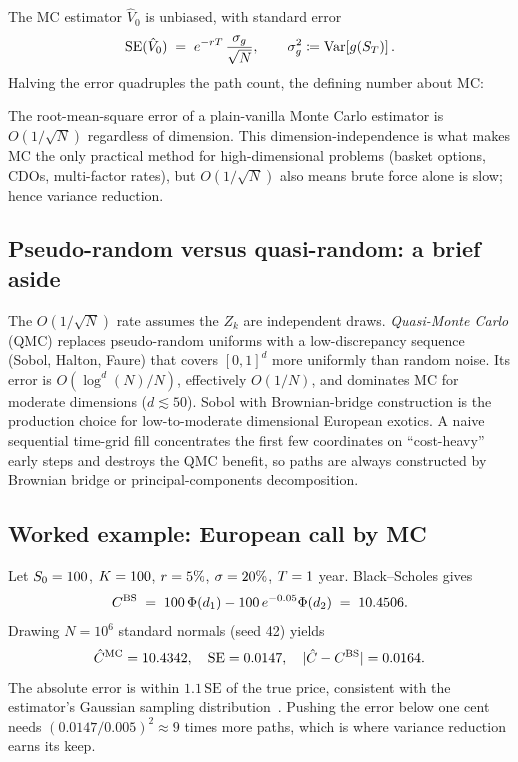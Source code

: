 The MC estimator $\hat V_0$ is unbiased, with standard error
\begin{equation}
  \mathrm{SE}(\hat V_0)
  \;=\; e^{-rT}\, \frac{\sigma_g}{\sqrt{N}},
  \qquad \sigma_g^2 \coloneqq \operatorname{Var}\!\left[ g(S_T) \right].
\end{equation}
Halving the error quadruples the path count, the defining number
about MC:

\begin{keyfactbox}
The root-mean-square error of a plain-vanilla Monte Carlo estimator
is $O(1/\sqrt{N})$ regardless of dimension.  This
dimension-independence is what makes MC the only practical method for
high-dimensional problems (basket options, CDOs, multi-factor rates),
but $O(1/\sqrt{N})$ also means brute force alone is slow; hence
variance reduction.
\end{keyfactbox}

\subsection{Pseudo-random versus quasi-random: a brief aside}

The $O(1/\sqrt N)$ rate assumes the $Z_k$ are independent draws.
\emph{Quasi-Monte Carlo} (QMC) replaces pseudo-random uniforms with
a low-discrepancy sequence (Sobol, Halton, Faure) that covers
$[0,1]^d$ more uniformly than random noise.  Its error is
$O(\log^d(N)/N)$, effectively $O(1/N)$, and dominates MC for
moderate dimensions ($d \lesssim 50$).  Sobol with Brownian-bridge
construction is the production choice for low-to-moderate dimensional
European exotics.  A naive sequential time-grid fill concentrates the
first few coordinates on ``cost-heavy'' early steps and destroys the
QMC benefit, so paths are always constructed by Brownian bridge or
principal-components decomposition.

\subsection{Worked example: European call by MC}

Let $S_0 = 100$, $K = 100$, $r = 5\%$, $\sigma = 20\%$,
$T = 1$ year.  Black--Scholes gives
\begin{equation}
  C^{\mathrm{BS}} \;=\; 100\,\Phi(d_1) - 100\,e^{-0.05}\Phi(d_2)
  \;=\; 10.4506.
\end{equation}
Drawing $N = 10^6$ standard normals (seed 42) yields
\begin{equation}
  \hat{C}^{\mathrm{MC}} = 10.4342,
  \quad \mathrm{SE} = 0.0147,
  \quad |\hat{C} - C^{\mathrm{BS}}| = 0.0164.
\end{equation}
The absolute error is within $1.1\,\mathrm{SE}$ of the true price,
consistent with the estimator's Gaussian sampling
distribution~\citeGlasserman.  Pushing the error below one cent needs
$(0.0147/0.005)^2 \approx 9$ times more paths, which is where
variance reduction earns its keep.


